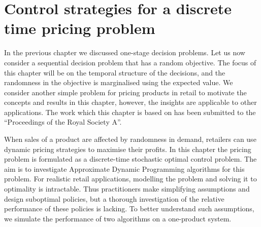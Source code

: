 \documentclass[main.tex]{subfiles}
\begin{document}
\chapter{Control strategies for a discrete time pricing
  problem}\label{ch:discrete_control}

In the previous chapter we discussed one-stage decision problems.
Let us now consider a sequential decision problem that has a random
objective. The focus of this chapter will be on the temporal structure of the
decisions, and the randomness in the objective is marginalised using
the expected value.
We consider another simple problem for pricing
products in retail to motivate the concepts and results in this
chapter, however, the insights are applicable to other applications.
The work which this chapter is based on has been submitted to
the ``Proceedings of the Royal Society A''.

When sales of a product are affected by randomness in demand,
retailers can use dynamic pricing strategies to maximise their
profits. In this chapter the pricing problem is formulated as a
discrete-time stochastic optimal control problem. The aim is to
investigate Approximate Dynamic Programming algorithms
\citep{powell2011approximate} for this
problem. For realistic retail applications, modelling the problem
and solving it to optimality is intractable. Thus practitioners make
simplifying assumptions and design suboptimal policies, but a thorough
investigation of the relative performance of these policies is
lacking. To better understand such assumptions, we simulate the
performance of two algorithms on a one-product system.

\end{document}
